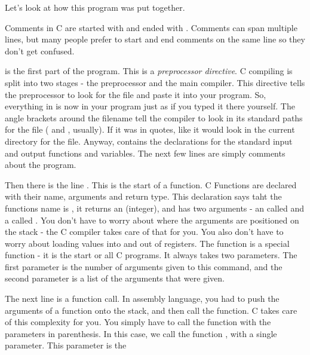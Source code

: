 Let's look at how this program was put together.

Comments in C are started with \icode{/*} and ended with
\icode{*/}.  Comments can span multiple lines, but 
many people prefer to start and end comments on the same line
so they don't get confused.

 is the first part of
the program.  This is a \emph{preprocessor directive}.
C compiling is split into two stages - the preprocessor and the
main compiler.  This directive tells the preprocessor to look
for the file  and paste it into
your program.  So, everything in  is
now in your program just as if you typed it there yourself.  The angle brackets
around the filename tell the compiler to look in its standard
paths for the file ( and 
, usually).  If it was
in quotes, like  it would
look in the current directory for the file.  Anyway, 
 contains the declarations for 
the standard input and output functions and variables.   The next few
lines are simply comments about the program.

Then there is the line .
This is the start of a function.  C Functions are declared with their 
name, arguments and return type.  This declaration says taht the functions
name is , it returns an  
(integer), and has two arguments - an  called
 and a  called 
.  You don't have to worry about where the arguments
are positioned on the stack - the C compiler takes care of that for you.
You also don't have to worry about loading values into and out of registers.
The  function is a special function - it is the
start or all C programs.  It always takes two parameters.  The first 
parameter is the number of arguments given to this command, and the
second parameter is a list of the arguments that were given.

The next line is a function call.  In assembly language, you had to 
push the arguments of a function onto the stack, and then call the function.
C takes care of this complexity for you.  You simply have to call the
function with the parameters in parenthesis.  In this case, we call
the function , with a single parameter.  This
parameter is the 


